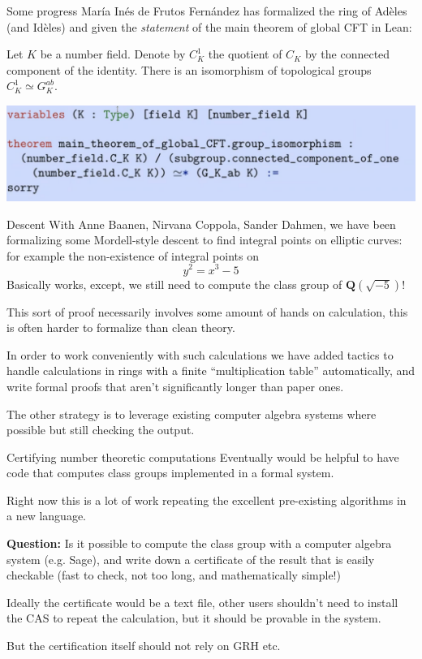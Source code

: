 \documentclass{beamer}
\theoremstyle{plain}
\newcommand{\QQ}{\mathbf Q}
\begin{document}
\begin{frame}{Some progress}
    María Inés de Frutos Fernández has formalized the ring of Adèles (and Idèles) and given the \emph{statement} of the main theorem of global CFT in Lean:
    \begin{theorem}
        Let $K$ be a number field. Denote by $C_{K}^{1}$ the quotient of $C_{K}$ by the connected component of the identity. There is an isomorphism of topological groups $C_{K}^{1} \simeq G_{K}^{a b}$.
    \end{theorem}
    \includegraphics[width=\textwidth]{maria.png}
\end{frame}

\begin{frame}{Descent}
    With Anne Baanen, Nirvana Coppola, Sander Dahmen, we have been formalizing some Mordell-style descent to find integral points on elliptic curves: for example the non-existence of integral points on
    $$y^2 = x^3 - 5$$\pause
    Basically works, except, we still need to compute the class group of $\QQ(\sqrt{-5})$!

    This sort of proof necessarily involves some amount of hands on calculation, this is often harder to formalize than clean theory. %

    In order to work conveniently with such calculations we have added tactics to handle calculations in rings with a finite ``multiplication table'' automatically, and write formal proofs that aren't significantly longer than paper ones.

    The other strategy is to leverage existing computer algebra systems where possible but still checking the output.
\end{frame}

\begin{frame}{Certifying number theoretic computations}
    Eventually would be helpful to have code that computes class groups implemented in a formal system.

    Right now this is a lot of work repeating the excellent pre-existing algorithms in a new language.  \pause

    \textbf{Question:} Is it possible to compute the class group with a computer algebra system (e.g. Sage), and write down a certificate of the result that is easily checkable (fast to check, not too long, and mathematically simple!)

    Ideally the certificate would be a text file, other users shouldn't need to install the CAS to repeat the calculation, but it should be provable in the system.

    But the certification itself should not rely on GRH etc.
\end{frame}
\end{document}
